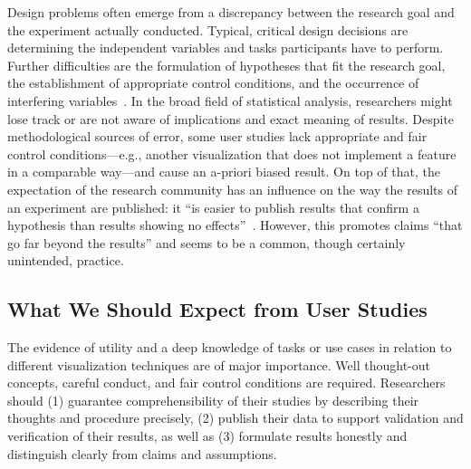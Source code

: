 \documentclass[sigconf,
natbib=true]{acmart}
\begin{document}
Design problems often emerge from a discrepancy between the research goal and the experiment actually conducted.
Typical, critical design decisions are determining the independent variables and tasks participants have to perform.
Further difficulties are the formulation of hypotheses that fit the research goal, the establishment of appropriate control conditions, and the occurrence of interfering variables~\cite{ware2013-infovis}.
In the broad field of statistical analysis, researchers might lose track or are not aware of implications and exact meaning of results.
Despite methodological sources of error, some user studies lack appropriate and fair control conditions---e.g., another visualization that does not implement a feature in a comparable way---and cause an a-priori biased result.
On top of that, the expectation of the research community has an influence on the way the results of an experiment are published:
it \enquote{is easier to publish results that confirm a hypothesis than results showing no effects}~\cite{ware2013-infovis}.
However, this promotes claims \enquote{that go far beyond the results} and seems to be a common, though certainly unintended, practice.

\subsection{What We Should Expect from User Studies}
The evidence of utility and a deep knowledge of tasks or use cases in relation to different visualization techniques are of major importance.
Well thought-out concepts, careful conduct, and fair control conditions are required.
Researchers should (1) guarantee comprehensibility of their studies by describing their thoughts and procedure precisely, (2) publish their data to support validation and verification of their results, as well as (3) formulate results honestly and distinguish clearly from claims and assumptions.
\end{document}
